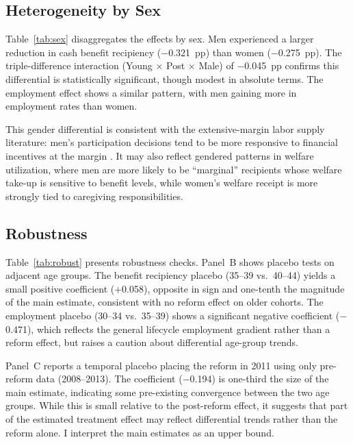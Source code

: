 \documentclass[12pt]{article}
\begin{document}
\subsection{Heterogeneity by Sex}



Table~\ref{tab:sex} disaggregates the effects by sex. Men experienced a larger reduction in cash benefit recipiency ($-$0.321~pp) than women ($-$0.275~pp). The triple-difference interaction (Young $\times$ Post $\times$ Male) of $-$0.045~pp confirms this differential is statistically significant, though modest in absolute terms. The employment effect shows a similar pattern, with men gaining more in employment rates than women.

This gender differential is consistent with the extensive-margin labor supply literature: men's participation decisions tend to be more responsive to financial incentives at the margin \citep{blundell2007,chetty2013}. It may also reflect gendered patterns in welfare utilization, where men are more likely to be ``marginal'' recipients whose welfare take-up is sensitive to benefit levels, while women's welfare receipt is more strongly tied to caregiving responsibilities.

\subsection{Robustness}



Table~\ref{tab:robust} presents robustness checks. Panel~B shows placebo tests on adjacent age groups. The benefit recipiency placebo (35--39 vs.\ 40--44) yields a small positive coefficient (+0.058), opposite in sign and one-tenth the magnitude of the main estimate, consistent with no reform effect on older cohorts. The employment placebo (30--34 vs.\ 35--39) shows a significant negative coefficient ($-$0.471), which reflects the general lifecycle employment gradient rather than a reform effect, but raises a caution about differential age-group trends.

Panel~C reports a temporal placebo placing the reform in 2011 using only pre-reform data (2008--2013). The coefficient ($-$0.194) is one-third the size of the main estimate, indicating some pre-existing convergence between the two age groups. While this is small relative to the post-reform effect, it suggests that part of the estimated treatment effect may reflect differential trends rather than the reform alone. I interpret the main estimates as an upper bound.
\end{document}

